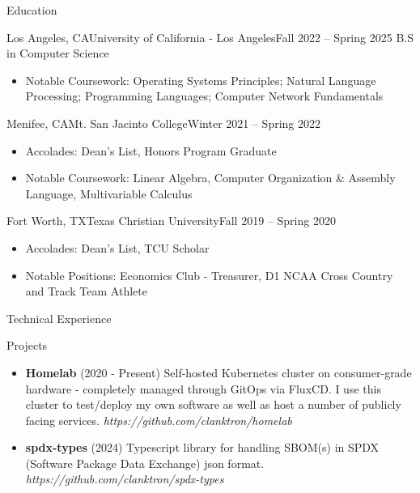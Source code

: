 \documentclass[]{resume}
\begin{document}
	\begin{cvsection}{Education}
		\begin{cvsubsection}{Los Angeles, CA}{University of California - Los Angeles}{Fall 2022 -- Spring 2025}
            B.S in Computer Science
			\begin{itemize}
				\item Notable Coursework: Operating Systems Principles; Natural Language Processing; Programming Languages; Computer Network Fundamentals
			\end{itemize}
		\end{cvsubsection}
        
        \begin{cvsubsection}{Menifee, CA}{Mt. San Jacinto College}{Winter 2021 -- Spring 2022}
            \begin{itemize}
                \item Accolades: Dean's List, Honors Program Graduate
                \item Notable Coursework: Linear Algebra, Computer Organization \& Assembly Language, Multivariable Calculus
            \end{itemize}
        \end{cvsubsection}
    
        \begin{cvsubsection}{Fort Worth, TX}{Texas Christian University}{Fall 2019 -- Spring 2020}
            \begin{itemize}
                \item Accolades: Dean's List, TCU Scholar
                \item Notable Positions: Economics Club - Treasurer, D1 NCAA Cross Country and Track Team Athlete
            \end{itemize}
        \end{cvsubsection}
	\end{cvsection}
	
	\begin{cvsection}{Technical Experience}
		\begin{cvsubsection}{Projects}{}{}
			\begin{itemize}
                \item \textbf{Homelab} (2020 - Present) Self-hosted Kubernetes cluster on consumer-grade hardware - completely managed through GitOps via FluxCD. I use this cluster to test/deploy my own software as well as host a number of publicly facing services. \textit{https://github.com/clanktron/homelab}
				\item \textbf{spdx-types} (2024) Typescript library for handling SBOM(s) in SPDX (Software Package Data Exchange) json format. \textit{https://github.com/clanktron/spdx-types}
			\end{itemize}
		\end{cvsubsection}
	\end{cvsection}
	
\end{document}
